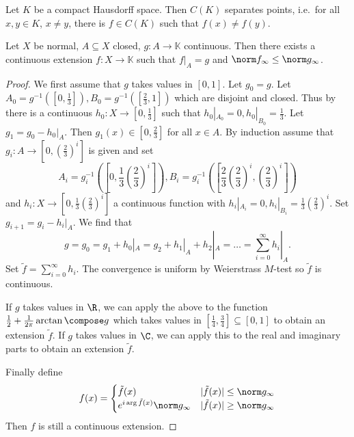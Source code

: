 \documentclass[a4paper]{article}
\newcommand{\K}{{\mathbb{K}}} %
\begin{document}
\begin{corollary}
  Let \(K\) be a compact Hausdorff space. Then \(C(K)\) separates points, i.e.\ for all \(x, y \in K\), \(x \neq y\), there is \(f \in C(K)\) such that \(f(x) \neq f(y)\).
\end{corollary}

\begin{theorem}
  Let \(X\) be normal, \(A \subseteq X\) closed, \(g: A \to \K\) continuous. Then there exists a continuous extension \(f: X \to \K\) such that \(f|_A = g\) and \(\norm f_\infty \leq \norm g_\infty\).
\end{theorem}

\begin{proof}
  We first assume that \(g\) takes values in \([0, 1]\). Let \(g_0 = g\). Let \(A_0 = g^{-1}([0, \frac{1}{3}]), B_0 = g^{-1}([\frac{2}{3}, 1])\) which are disjoint and closed. Thus by  there is a continuous \(h_0: X \to [0, \frac{1}{3}]\) such that \(h_0|_{A_0} = 0, h_0|_{B_0} = \frac{1}{3}\). Let \(g_1 = g_0 - h_0|_A\). Then \(g_1(x) \in [0, \frac{2}{3}]\) for all \(x \in A\). By induction assume that \(g_i: A \to [0, \left(\frac{2}{3}\right)^i]\) is given and set
  \[
    A_i = g_i^{-1}(\left[0, \frac{1}{3} \left(\frac{2}{3}\right)^i \right]), B_i = g_i^{-1}(\left[ \frac{2}{3} \left(\frac{2}{3}\right)^i, \left(\frac{2}{3}\right)^i \right])
  \]
  and \(h_i: X \to [0, \frac{1}{3}\left(\frac{2}{3}\right)^i]\) a continuous function with \(h_i|_{A_i} = 0, h_i|_{B_i} = \frac{1}{3}\left(\frac{2}{3}\right)^i\). Set \(g_{i + 1} = g_i - h_i|_A\). We find that
  \[
    g
    = g_0
    = g_1 + h_0|_A
    = g_2 + h_1|_A + h_2|_A
    = \dots
    = \sum_{i = 0}^\infty h_i|_A.
  \]
  Set \(\tilde f = \sum_{i = 0}^\infty h_i\). The convergence is uniform by Weierstrass \(M\)-test so \(\tilde f\) is continuous.

  If \(g\) takes values in \(\R\), we can apply the above to the function \(\frac{1}{2} + \frac{1}{2\pi} \arctan \compose g\) which takes values in \([\frac{1}{4}, \frac{3}{4}] \subseteq [0, 1]\) to obtain an extension \(\tilde f\). If \(g\) takes values in \(\C\), we can apply this to the real and imaginary parts to obtain an extension \(\tilde f\).

  Finally define
  \[
    f(x) =
    \begin{cases}
      \tilde f(x) & |\tilde f(x)| \leq \norm g_\infty \\
      e^{i \arg \tilde f(x)} \norm g_\infty & |\tilde f(x)| \geq \norm g_\infty
    \end{cases}
  \]
  Then \(f\) is still a continuous extension.
\end{proof}
\end{document}

